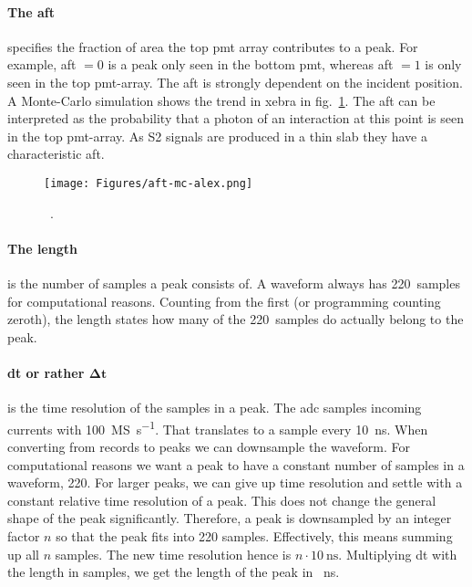 \paragraph{The \gls{aft}} specifies the fraction of area the top \gls{pmt} array contributes to a peak.
For example, \gls{aft} $ = 0 $ is a peak only seen in the bottom \gls{pmt}, whereas \gls{aft} $ = 1 $ is only seen in the top \gls{pmt}-array.
The \gls{aft} is strongly dependent on the incident position.
A Monte-Carlo simulation shows the trend in \gls{xebra} in fig.~\ref{fig:aft-mc}.
The \gls{aft} can be interpreted as the probability that a photon of an interaction at this point is seen in the top \gls{pmt}-array.
As S2 signals are produced in a thin slab they have a characteristic \gls{aft}.

\begin{figure}
\centering
\texttt{[image: Figures/aft-mc-alex.png]}  %
    \caption[\gls{aft} in \gls{xebra} Simulated]{
        ~\cite{ABism}.
    }
\label{fig:aft-mc}
\end{figure}


\paragraph{The length} is the number of samples a peak consists of.
A waveform always has \SI{220}{samples} for computational reasons.
Counting from the first (or programming counting zeroth), the length states how many of the \SI{220}{samples} do actually belong to the peak.

\paragraph{dt or rather $ \mathbf{\Delta t}$} is the time resolution of the samples in a peak.
The \gls{adc} samples incoming currents with \SI{100}{\mega S\per\second}.
That translates to a sample every \SI{10}{\nano\second}.
When converting from records to peaks we can downsample the waveform.
For computational reasons we want a peak to have a constant number of samples in a waveform, 220.
For larger peaks, we can give up time resolution and settle with a constant relative time resolution of a peak.
This does not change the general shape of the peak significantly.
Therefore, a peak is downsampled by an integer factor $ n $ so that the peak fits into 220 samples.
Effectively, this means summing up all $ n $ samples.
The new time resolution hence is $ n \cdot \SI{10}{\nano\second} $.
Multiplying dt with the length in samples, we get the length of the peak in \SI{}{\nano\second}.

